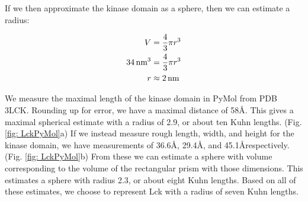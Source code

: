 \documentclass[../AdvancementSummary.tex]{subfiles}
\begin{document}
If we then approximate the kinase domain as a sphere, then we can estimate a radius: 

\begin{align*}
V &= \frac{4}{3}\pi r^3 \\
34 \,\mbox{nm}^3 &= \frac{4}{3} \pi r^3 \\
r &\approx 2 \,\mbox{nm} \\
\end{align*}
%

We measure the maximal length of the kinase domain in PyMol from PDB 3LCK. Rounding up for error, we have a maximal distance of 58\AA. This gives a maximal spherical estimate with a radius of 2.9\nm, or about ten Kuhn lengths. (Fig. \ref{fig: LckPyMol}a) If we instead measure rough length, width, and height for the kinase domain, we have measurements of 36.6\AA, 29.4\AA, and 45.1\AA respectively. (Fig. \ref{fig: LckPyMol}b) From these we can estimate a sphere with volume corresponding to the volume of the rectangular prism with those dimensions.  This estimates a sphere with radius 2.3\nm, or about eight Kuhn lengths. Based on all of these estimates, we choose to represent Lck with a radius of seven Kuhn lengths.
\end{document}
